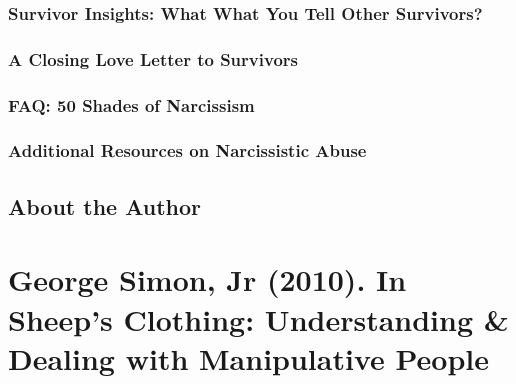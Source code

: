\documentclass[oneside]{book}
\numberwithin{equation}{section}
\begin{document}
\subsection{Survivor Insights: What What You Tell Other Survivors?}

\subsection{A Closing Love Letter to Survivors}

\subsection{FAQ: 50 Shades of Narcissism}

\subsection{Additional Resources on Narcissistic Abuse}

\section{About the Author}


\chapter{George Simon, Jr (2010). In Sheep's Clothing: Understanding \& Dealing with Manipulative People}
\end{document}
